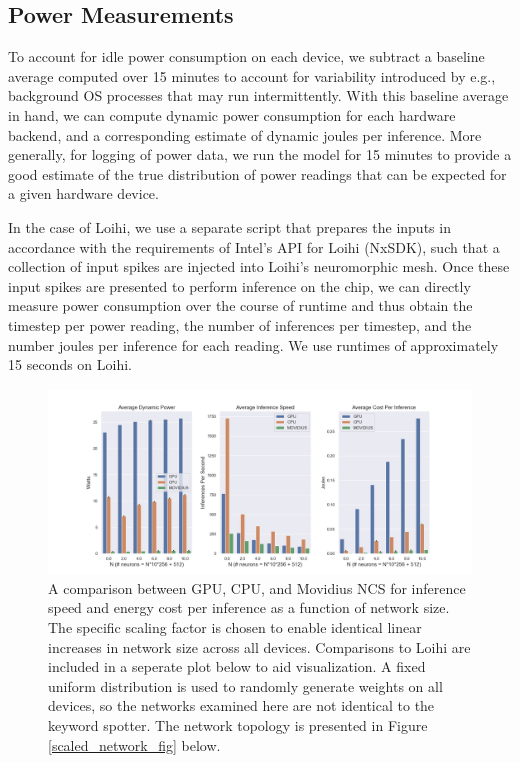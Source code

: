 \documentclass{article}
\begin{document}
\subsection{Power Measurements}

To account for idle power consumption on each device, we subtract a baseline average computed over 15 minutes to account for variability introduced by e.g., background OS processes that may run intermittently. With this baseline average in hand, we can compute dynamic power consumption for each hardware backend, and a corresponding estimate of dynamic joules per inference. More generally, for logging of power data, we run the model for 15 minutes to provide a good estimate of the true distribution of power readings that can be expected for a given hardware device.

In the case of Loihi, we use a separate script that prepares the inputs in accordance with the requirements of Intel's API for Loihi (NxSDK), such that a collection of input spikes are injected into Loihi's neuromorphic mesh. Once these input spikes are presented to perform inference on the chip, we can directly measure power consumption over the course of runtime and thus obtain the timestep per power reading, the number of inferences per timestep, and the number joules per inference for each reading. We use runtimes of approximately 15 seconds on Loihi.

\begin{figure}[ht!]
\centering
    \includegraphics[width=6.5in]{./figures/comp_summary.png}
	\caption{A comparison between GPU, CPU, and Movidius NCS for inference speed and energy cost per inference as a function of network size. The specific scaling factor is chosen to enable identical linear increases in network size across all devices. Comparisons to Loihi are included in a seperate plot below to aid visualization. A fixed uniform distribution is used to randomly generate weights on all devices, so the networks examined here are not identical to the keyword spotter. The network topology is presented in Figure \ref{scaled_network_fig} below.}
\label{comp_fig}
\end{figure}
\end{document}
